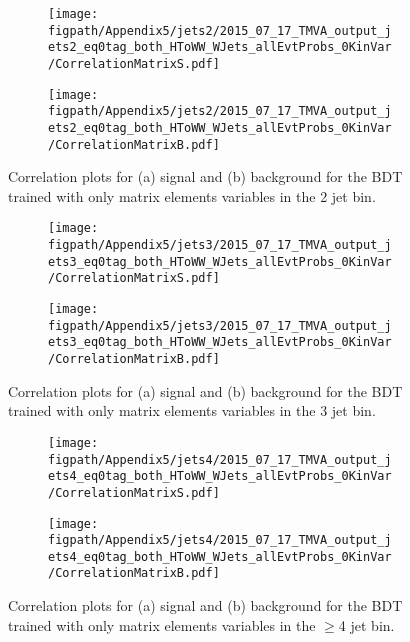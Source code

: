 \begin{figure}[!hbt]
    \centering
    \begin{subfigure}[t]{0.48\textwidth}
        \texttt{[image: \\figpath/Appendix5/jets2/2015\_07\_17\_TMVA\_output\_jets2\_eq0tag\_both\_HToWW\_WJets\_allEvtProbs\_0KinVar/CorrelationMatrixS.pdf]}
        \caption{}
        \label{fig:MEBDT_jets2_CorrelationS}
    \end{subfigure}
    \begin{subfigure}[t]{0.48\textwidth}
        \texttt{[image: \\figpath/Appendix5/jets2/2015\_07\_17\_TMVA\_output\_jets2\_eq0tag\_both\_HToWW\_WJets\_allEvtProbs\_0KinVar/CorrelationMatrixB.pdf]}
        \caption{}
        \label{fig:MEBDT_jets2_CorrelationB}
    \end{subfigure}
    \caption{Correlation plots for (a) signal and (b) background for the BDT trained with only matrix elements variables in the 2 jet bin.}
    \label{fig:MEBDT_jets2_Correlations}
\end{figure}

\begin{figure}[!hbt]
    \centering
    \begin{subfigure}[t]{0.48\textwidth}
        \texttt{[image: \\figpath/Appendix5/jets3/2015\_07\_17\_TMVA\_output\_jets3\_eq0tag\_both\_HToWW\_WJets\_allEvtProbs\_0KinVar/CorrelationMatrixS.pdf]}
        \caption{}
        \label{fig:MEBDT_jets3_CorrelationS}
    \end{subfigure}
    \begin{subfigure}[t]{0.48\textwidth}
        \texttt{[image: \\figpath/Appendix5/jets3/2015\_07\_17\_TMVA\_output\_jets3\_eq0tag\_both\_HToWW\_WJets\_allEvtProbs\_0KinVar/CorrelationMatrixB.pdf]}
        \caption{}
        \label{fig:MEBDT_jets3_CorrelationB}
    \end{subfigure}
    \caption{Correlation plots for (a) signal and (b) background for the BDT trained with only matrix elements variables in the 3 jet bin.}
    \label{fig:MEBDT_jets3_Correlations}
\end{figure}

\begin{figure}[!hbt]
    \centering
    \begin{subfigure}[t]{0.48\textwidth}
        \texttt{[image: \\figpath/Appendix5/jets4/2015\_07\_17\_TMVA\_output\_jets4\_eq0tag\_both\_HToWW\_WJets\_allEvtProbs\_0KinVar/CorrelationMatrixS.pdf]}
        \caption{}
        \label{fig:MEBDT_jets4_CorrelationS}
    \end{subfigure}
    \begin{subfigure}[t]{0.48\textwidth}
        \texttt{[image: \\figpath/Appendix5/jets4/2015\_07\_17\_TMVA\_output\_jets4\_eq0tag\_both\_HToWW\_WJets\_allEvtProbs\_0KinVar/CorrelationMatrixB.pdf]}
        \caption{}
        \label{fig:MEBDT_jets4_CorrelationB}
    \end{subfigure}
    \caption{Correlation plots for (a) signal and (b) background for the BDT trained with only matrix elements variables in the $\geqslant$4 jet bin.}
    \label{fig:MEBDT_jets4_Correlations}
\end{figure}

